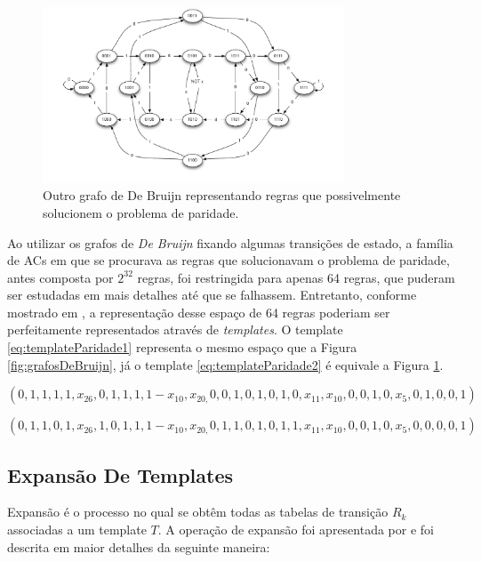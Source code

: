 \documentclass[12pt,a4paper]{article}
\begin{document}
\begin{figure}[h!]
  \centering
  \includegraphics[width=0.8\textwidth]{grafo2.pdf}
    \caption{Outro grafo de De Bruijn representando regras que possivelmente solucionem o problema de paridade.}
    \label{fig:grafosDeBruijn2}
\end{figure}

Ao utilizar os grafos de \textit{De Bruijn} fixando algumas transições de estado, a família de ACs em que se procurava as regras que solucionavam o problema de paridade, antes composta por $2^{32}$ regras, foi restringida para apenas 64 regras, que puderam ser estudadas em mais detalhes até que se falhassem. Entretanto, conforme mostrado em \cite{Verardo2014}, a representação desse espaço de 64 regras poderiam ser perfeitamente representados através de \textit{templates}. O template \ref{eq:templateParidade1} representa o mesmo espaço que a Figura \ref{fig:grafosDeBruijn}, já o template \ref{eq:templateParidade2} é equivale a Figura \ref{fig:grafosDeBruijn2}.

\begin{equation}
\left(0,1,1,1,1,x_{26},0,1,1,1,1-x_{10},x_{20,}0,0,1,0,1,0,1,0,x_{11},x_{10},0,0,1,0,x_5,0,1,0,0,1\right)
\label{eq:templateParidade1}
\end{equation}

\begin{equation}
\left(0,1,1,0,1,x_{26},1,0,1,1,1-x_{10},x_{20,}0,1,1,0,1,0,1,1,x_{11},x_{10},0,0,1,0,x_5,0,0,0,0,1\right)
\label{eq:templateParidade2}
\end{equation}


\newpage\newpage
\subsection{Expansão De Templates}
	Expansão é o processo no qual se obtêm todas as tabelas de transição $R_k$ associadas a um template $T$.
	A operação de expansão foi apresentada por \cite{Verardo2014} e foi descrita em maior detalhes da seguinte maneira:
\end{document}

